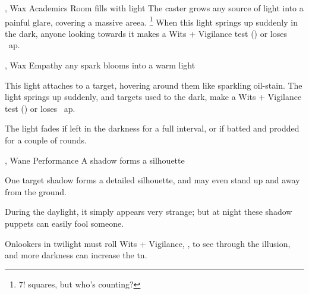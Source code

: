   {\mFire, \mAir}%
  {Wax}%
  {\duplicated}%
  {Academics}%
  {Room fills with light}%
  {
    The caster grows any source of light into a painful glare, covering a massive areea.%
    \footnote{$7!$ squares, but who's counting?}
    When this light springs up suddenly in the dark, anyone looking towards it makes a Wits + Vigilance test () or loses ~\gls{ap}.
  }

  {\mFire, \mAir}%
  {Wax}%
  {\detailed}%
  {Empathy}%
  {any spark blooms into a warm light}%
  {
    This light attaches to a target, hovering around them like sparkling oil-stain.
    The light springs up suddenly, and targets used to the dark, make a Wits + Vigilance test () or loses ~\gls{ap}.

    The light fades if left in the darkness for a full \gls{interval}, or if batted and prodded for a couple of rounds.
  }

  {\mFire, \mAir}%
  {Wane}%
  {\detailed}%
  {Performance}%
  {A shadow forms a silhouette}%
  {
    One target shadow forms a detailed silhouette, and may even stand up and away from the ground.

    During the daylight, it simply appears very strange; but at night these shadow puppets can easily fool someone.

    \setcounter{track}{\value{spelllevel}}
    \addtocounter{track}{7}
    Onlookers in twilight must roll Wits + Vigilance, , to see through the illusion, and more darkness can increase the \gls{tn}.
  }

